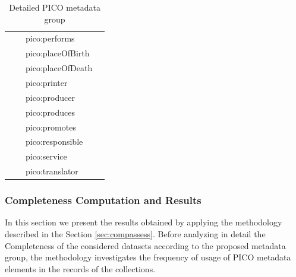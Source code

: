 \documentclass[epsfig,a4paper,12pt,titlepage]{book}
\begin{document}
\begin{center}
\begin{table}[h]
\begin{adjustbox}{width=\textwidth}
\begin{tabular}{|p{3.5cm}|p{3.5cm}|p{4.8cm}|p{3.8cm}|}
                     &                      & pico:performs                 &                                 \\
                     &                      & pico:placeOfBirth             &                                 \\
                     &                      & pico:placeOfDeath             &                                 \\
                     &                      & pico:printer                  &                                 \\
                     &                      & pico:producer                 &                                 \\
                     &                      & pico:produces                 &                                 \\
                     &                      & pico:promotes                 &                                 \\
                     &                      & pico:responsible              &                                 \\
                     &                      & pico:service                  &                                 \\
                     &                      & pico:translator               &                                 \\
\hline
\end{tabular}
	\end{adjustbox}
	\caption{Detailed PICO metadata group}
		\label{tab:picoGruop}       %
	\end{table}

\end{center}

\subsubsection{Completeness Computation and Results}
In this section we present the results obtained by applying the methodology described in the Section \ref{sec:compassess}. Before analyzing in detail the Completeness of the considered datasets according to the proposed metadata group, the methodology investigates the frequency of usage of PICO metadata elements in the records of the collections.
\end{document}
